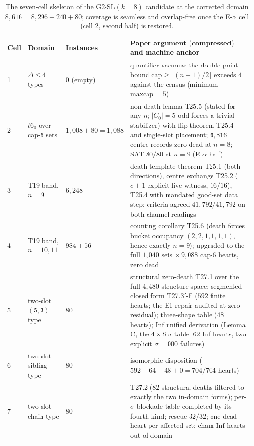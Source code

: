 \begin{table}[ht]
\centering\small
\caption{The seven-cell skeleton of the G2-SL$(k{=}8)$ candidate at the corrected domain
$8{,}616=8{,}296+240+80$; coverage is seamless and overlap-free once the E-$\alpha$ cell
(cell 2, second half) is restored.}
\label{tab:sevencells}
\begin{tabular}{p{0.5cm} p{4.3cm} p{2.1cm} p{6.6cm}}
\hline
Cell & Domain & Instances & Paper argument (compressed) and machine anchor \\
\hline
1 & $\Delta\le4$ types & $0$ (empty) & quantifier-vacuous: the double-point bound
  $\mathrm{cap}\ge\lceil(n-1)/2\rceil$ exceeds $4$ against the census (minimum
  $\mathrm{maxcap}=5$) \\
2 & $t6_0$ over cap-$5$ sets & $1{,}008+80=1{,}088$ & non-death lemma T25.5 (stated for any
  $n$; $|C_0|=5$ odd forces a trivial stabilizer) with flip theorem T25.4 and single-slot
  placement; $6{,}816$ centre records zero dead at $n=8$; SAT $80/80$ at $n=9$ (E-$\alpha$
  half) \\
3 & T19 band, $n=9$ & $6{,}248$ & death-template theorem T25.1 (both directions), centre
  exchange T25.2 ($c+1$ explicit live witness, $16/16$), T25.4 with mandated good-set data
  step; criteria agreed $41{,}792/41{,}792$ on both channel readings \\
4 & T19 band, $n=10,11$ & $984+56$ & counting corollary T25.6 (death forces bucket occupancy
  $(2,2,1,1,1,1)$, hence exactly $n=9$); upgraded to the full $1{,}040$ sets $\times\,
  9{,}088$ cap-$6$ hearts, zero dead \\
5 & two-slot $(5,3)$ type & $80$ & structural zero-death T27.1 over the full $4{,}480$-structure
  space; segmented closed form T27.3$'$-F ($592$ finite hearts; the E1 repair audited at
  zero residual); three-shape table ($48$ hearts); Inf unified derivation (Lemma C, the
  $4\times8$ $\sigma$ table, $62$ Inf hearts, two explicit $\sigma=000$ failures) \\
6 & two-slot sibling type & $80$ & isomorphic disposition ($592+64+48+0=704/704$ hearts) \\
7 & two-slot chain type & $80$ & T27.2 ($82$ structural deaths filtered to exactly the two
  in-domain forms); per-$\sigma$ blockade table completed by its fourth kind; rescue
  $32/32$; one dead heart per affected set; chain Inf hearts out-of-domain \\
\hline
\end{tabular}
\end{table}

